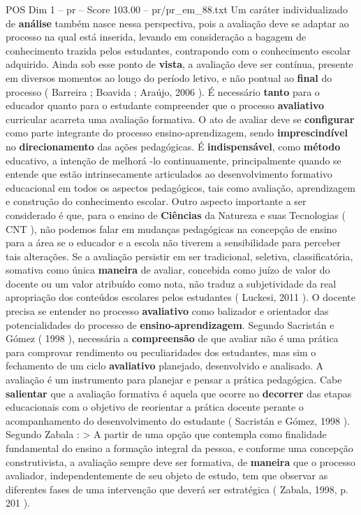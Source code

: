 \begin{textsample}{POS Dim 1 – pr – Score 103.00 – pr/pr\_em\_88.txt}
Um caráter individualizado de \textbf{análise} também nasce nessa perspectiva, pois a avaliação deve se adaptar ao processo na qual está inserida, levando em consideração a bagagem de conhecimento trazida pelos estudantes, contrapondo com o conhecimento escolar adquirido.
Ainda sob esse ponto de \textbf{vista}, a avaliação deve ser contínua, presente em diversos momentos ao longo do período letivo, e não pontual ao \textbf{final} do processo ( Barreira ; Boavida ; Araújo, 2006 ).
É necessário \textbf{tanto} para o educador quanto para o estudante compreender que o processo \textbf{avaliativo} curricular acarreta uma avaliação formativa.
O ato de avaliar deve se \textbf{configurar} como parte integrante do processo ensino-aprendizagem, sendo \textbf{imprescindível} no \textbf{direcionamento} das ações pedagógicas.
É \textbf{indispensável}, como \textbf{método} educativo, a intenção de melhorá -lo continuamente, principalmente quando se entende que estão intrinsecamente articulados ao desenvolvimento formativo educacional em todos os aspectos pedagógicos, tais como avaliação, aprendizagem e construção do conhecimento escolar.
Outro aspecto importante a ser considerado é que, para o ensino de \textbf{Ciências} da Natureza e suas Tecnologias ( CNT ), não podemos falar em mudanças pedagógicas na concepção de ensino para a área se o educador e a escola não tiverem a sensibilidade para perceber tais alterações.
Se a avaliação persistir em ser tradicional, seletiva, classificatória, somativa como única \textbf{maneira} de avaliar, concebida como juízo de valor do docente ou um valor atribuído como nota, não traduz a subjetividade da real apropriação dos conteúdos escolares pelos estudantes ( Luckesi, 2011 ).
O docente precisa se entender no processo \textbf{avaliativo} como balizador e orientador das potencialidades do processo de \textbf{ensino-aprendizagem}.
Segundo Sacristán e Gómez ( 1998 ), necessária a \textbf{compreensão} de que avaliar não é uma prática para comprovar rendimento ou peculiaridades dos estudantes, mas sim o fechamento de um ciclo \textbf{avaliativo} planejado, desenvolvido e analisado.
A avaliação é um instrumento para planejar e pensar a prática pedagógica.
Cabe \textbf{salientar} que a avaliação formativa é aquela que ocorre no \textbf{decorrer} das etapas educacionais com o objetivo de reorientar a prática docente perante o acompanhamento do desenvolvimento do estudante ( Sacristán e Gómez, 1998 ).
Segundo Zabala : > A partir de uma opção que contempla como finalidade fundamental do ensino a formação integral da pessoa, e conforme uma concepção construtivista, a avaliação sempre deve ser formativa, de \textbf{maneira} que o processo avaliador, independentemente de seu objeto de estudo, tem que observar as diferentes fases de uma intervenção que deverá ser estratégica ( Zabala, 1998, p. 201 ).

\end{textsample}
